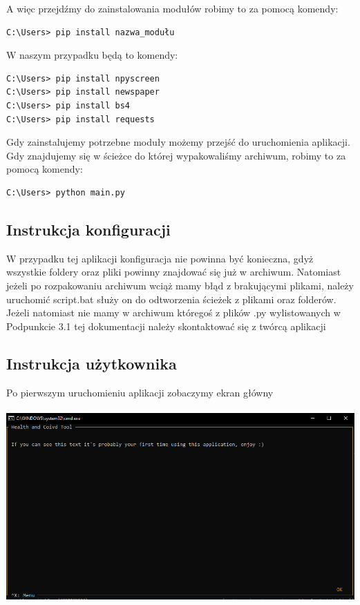 \documentclass{article}
\begin{document}
\pagebreak
A więc przejdźmy do zainstalowania modułów robimy to za pomocą komendy:

\begin{verbatim}
C:\Users> pip install nazwa_modułu
\end{verbatim}

W naszym przypadku będą to komendy:
\begin{verbatim}
C:\Users> pip install npyscreen
C:\Users> pip install newspaper
C:\Users> pip install bs4
C:\Users> pip install requests
\end{verbatim}

Gdy zainstalujemy potrzebne moduły możemy przejść do uruchomienia aplikacji. 
Gdy znajdujemy się w ścieżce do której wypakowaliśmy archiwum, robimy to za pomocą komendy:

\begin{verbatim}
C:\Users> python main.py
\end{verbatim}


\subsection{Instrukcja konfiguracji}

W przypadku tej aplikacji konfiguracja nie powinna być konieczna, gdyż wszystkie foldery oraz pliki powinny znajdować się już w archiwum.
Natomiast jeżeli po rozpakowaniu archiwum wciąż mamy błąd z brakującymi plikami, należy uruchomić script.bat służy on do odtworzenia ścieżek z plikami oraz folderów.
Jeżeli natomiast nie mamy w archiwum któregoś z plików .py wylistowanych w Podpunkcie 3.1 tej dokumentacji należy skontaktować się z twórcą aplikacji 

\pagebreak

\subsection{Instrukcja użytkownika}

Po pierwszym uruchomieniu aplikacji zobaczymy ekran główny\\ \\
\includegraphics[width=\textwidth]{images/main_screen_first_run.png}
\end{document}
